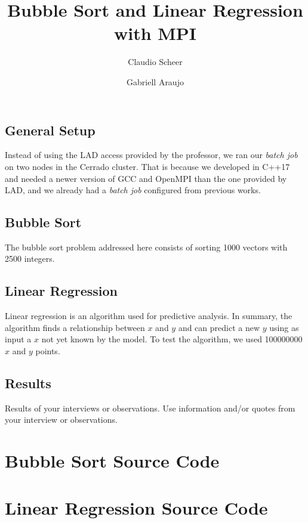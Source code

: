 \documentclass[10pt, twocolumn]{report}
\begin{document}
\title{Bubble Sort and Linear Regression with MPI}

\author[1]{Claudio Scheer}
\author[1]{Gabriell Araujo}

\maketitle

\section {General Setup}
Instead of using the LAD access provided by the professor, we ran our \textit{batch job} on two nodes in the Cerrado cluster. That is because we developed in C++17 and needed a newer version of GCC and OpenMPI than the one provided by LAD, and we already had a \textit{batch job} configured from previous works.

\section{Bubble Sort}
The bubble sort problem addressed here consists of sorting 1000 vectors with 2500 integers.

\section {Linear Regression}
Linear regression is an algorithm used for predictive analysis. In summary, the algorithm finds a relationship between $x$ and $y$ and can predict a new $y$ using as input a $x$ not yet known by the model. To test the algorithm, we used 100000000 $x$ and $y$ points.

\section{Results}
Results of your interviews or observations. Use information and/or quotes from your interview or observations.

\begin{appendices}
	\chapter{Bubble Sort Source Code}
	
	
	

	\chapter{Linear Regression Source Code}
	
	
	
\end{appendices}
\end{document}
